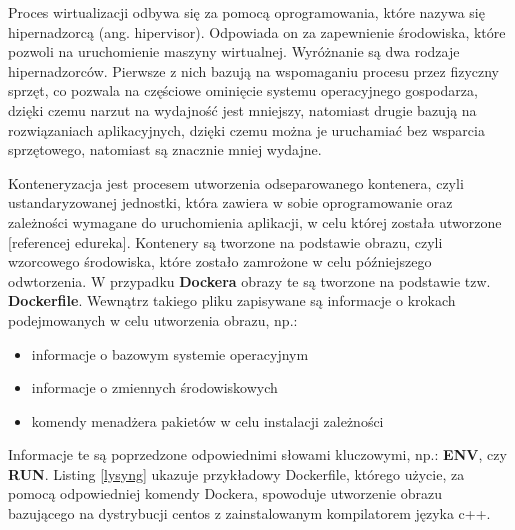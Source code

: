 Proces wirtualizacji odbywa się za pomocą oprogramowania, które nazywa się hipernadzorcą (ang. hipervisor). Odpowiada on za zapewnienie środowiska, które pozwoli na uruchomienie maszyny wirtualnej. Wyróżnanie są dwa rodzaje hipernadzorców. Pierwsze z nich bazują na wspomaganiu procesu przez fizyczny sprzęt, co pozwala na częściowe ominięcie systemu operacyjnego gospodarza, dzięki czemu narzut na wydajność jest mniejszy, natomiast drugie bazują na rozwiązaniach aplikacyjnych, dzięki czemu można je uruchamiać bez wsparcia sprzętowego, natomiast są znacznie mniej wydajne.

Konteneryzacja jest procesem utworzenia odseparowanego kontenera, czyli ustandaryzowanej jednostki, która zawiera w sobie oprogramowanie oraz zależności wymagane do uruchomienia aplikacji, w celu której została utworzone [referencej edureka]. Kontenery są tworzone na podstawie obrazu, czyli wzorcowego środowiska, które zostało zamrożone w celu późniejszego odwtorzenia. W przypadku \textbf{Dockera} obrazy te są tworzone na podstawie tzw. \textbf{Dockerfile}. Wewnątrz takiego pliku zapisywane są informacje o krokach podejmowanych w celu utworzenia obrazu, np.:
\begin{itemize}
\item informacje o bazowym systemie operacyjnym
\item informacje o zmiennych środowiskowych
\item komendy menadżera pakietów w celu instalacji zależności
\end{itemize}
Informacje te są poprzedzone odpowiednimi słowami kluczowymi, np.: \textbf{ENV}, czy \textbf{RUN}. Listing \ref{lysyng} ukazuje przykładowy Dockerfile, którego użycie, za pomocą odpowiedniej komendy Dockera, spowoduje utworzenie obrazu bazującego na dystrybucji centos z zainstalowanym kompilatorem języka c++.

\begin{lstlisting}[label={lis:dockerfile}, language=Dockerfile, caption={Przykładowy Dockerfile}]

\end{lstlisting}


